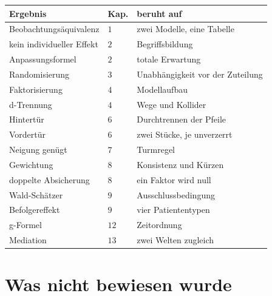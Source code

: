 \begin{merksatz}
\begin{center}
{\small
\renewcommand{\arraystretch}{1.4}
\begin{tabular}{@{}P{3.8cm}P{1.0cm}P{3.4cm}@{}}
\toprule
\textbf{Ergebnis} & \textbf{Kap.} & \textbf{beruht auf}\\
\midrule
Beobachtungs\-äquivalenz & $1$ & zwei Modelle, eine Tabelle\\
kein individueller Effekt & $2$ & Begriffsbildung\\
Anpassungsformel & $2$ & totale Erwartung\\
Randomisierung & $3$ & Unabhängigkeit vor der Zuteilung\\
Faktorisierung & $4$ & Modellaufbau\\
d-Trennung & $4$ & Wege und Kollider\\
Hintertür & $6$ & Durchtrennen der Pfeile\\
Vordertür & $6$ & zwei Stücke, je unverzerrt\\
Neigung genügt & $7$ & Turmregel\\
Gewichtung & $8$ & Konsistenz und Kürzen\\
doppelte Absicherung & $8$ & ein Faktor wird null\\
Wald-Schätzer & $9$ & Ausschlussbedingung\\
Befolgereffekt & $9$ & vier Patiententypen\\
g-Formel & $12$ & Zeitordnung\\
Mediation & $13$ & zwei Welten zugleich\\
\bottomrule
\end{tabular}}
\end{center}
\end{merksatz}

\section{Was nicht bewiesen wurde}

